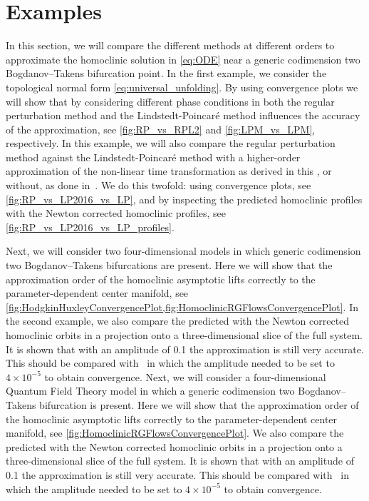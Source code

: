 \section{Examples}
\label{sec:examples}

In this section, we will compare the different methods at different orders to
approximate the homoclinic solution in \cref{eq:ODE} near a generic codimension two
Bogdanov--Takens bifurcation point. In the first example, we consider the
topological normal form \cref{eq:universal_unfolding}. By using convergence plots
we will show that by consi\-de\-ring different phase conditions in both the regular
perturbation method and the Lindstedt-Poincar\'e method influences the accuracy
of the approximation, see \cref{fig:RP_vs_RPL2} and \cref{fig:LPM_vs_LPM},
respectively. In this example, we will also compare the regular perturbation
method against the Lindstedt-Poincar\'e method with a higher-order
approximation of the non-linear time transformation as derived
in this \paper{}, or without, as done in~\cite{Al-Hdaibat2016}. We do this twofold:
using convergence plots, see \cref{fig:RP_vs_LP2016_vs_LP}, and by inspecting
the predicted homoclinic profiles with the Newton corrected homoclinic
profiles, see \cref{fig:RP_vs_LP2016_vs_LP_profiles}.

\ifthesis
Next, we will consider two four-dimensional models in which generic codimension
two Bogdanov--Takens bifurcations are present. Here we will show that the
approximation order of the homoclinic asymptotic lifts correctly to the
parameter-dependent center manifold, see
\cref{fig:HodgkinHuxleyConvergencePlot,fig:HomoclinicRGFlowsConvergencePlot}. In the
second example, we also compare the predicted with the Newton corrected
homoclinic orbits in a projection onto a three-dimensional slice of the full
system. It is shown that with an amplitude of 0.1 the approximation is still
very accurate. This should be compared with~\cite[section 6.2]{Al-Hdaibat2016}
in which the amplitude needed to be set to $4\times 10^{-5}$ to obtain
convergence.
\else
Next, we will consider a four-dimensional Quantum Field Theory model in which a
generic codimension two Bogdanov--Takens bifurcation is present. Here we will
show that the approximation order of the homoclinic asymptotic lifts correctly
to the parameter-dependent center manifold, see
\cref{fig:HomoclinicRGFlowsConvergencePlot}. We also compare the predicted with
the Newton corrected homoclinic orbits in a projection onto a three-dimensional
slice of the full system. It is shown that with an amplitude of 0.1 the
approximation is still very accurate. This should be compared
with~\cite[section 6.2]{Al-Hdaibat2016} in which the amplitude needed to be set
to $4\times 10^{-5}$ to obtain convergence.
\fi

